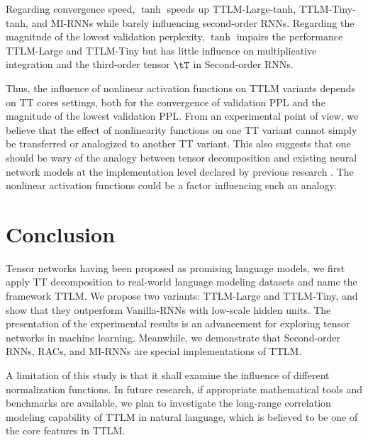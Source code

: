 \documentclass{article}
\newcommand{\benyou}[1]{{\bf \color{blue} [[benyou says ``#1'']]}}
\theoremstyle{plain}
\theoremstyle{definition}
\theoremstyle{remark}
\begin{document}
Regarding convergence speed, $\tanh$ speeds up TTLM-Large-tanh, TTLM-Tiny-tanh, and MI-RNNs while barely influencing second-order RNNs. Regarding the magnitude of the lowest validation perplexity,  $\tanh$ impairs the performance  TTLM-Large and TTLM-Tiny but has little influence on multiplicative integration and the third-order tensor $\tT$ in Second-order RNNs.  

Thus, the influence of nonlinear activation functions on TTLM variants depends on TT cores settings, both for the convergence of validation PPL and the magnitude of the lowest validation PPL.  From an experimental point of view, we believe that the effect of nonlinearity functions on one TT variant cannot simply be transferred or analogized to another TT variant. This also suggests that one should be wary of the analogy between tensor decomposition and existing neural network models at the implementation level declared by previous research \citep{khrulkov2018expressive, levine2018benefits}. The nonlinear activation functions could be a factor influencing such an analogy.


\section{Conclusion}

Tensor networks having been proposed as promising language models, we first apply TT decomposition to real-world language modeling datasets and name the framework TTLM. We propose two variants: TTLM-Large and TTLM-Tiny, and show that they outperform Vanilla-RNNs with low-scale hidden units. The presentation of the experimental results is an advancement for exploring tensor networks in machine learning. Meanwhile, we demonstrate that Second-order RNNs, RACs, and MI-RNNs are special implementations of TTLM. 

A limitation of this study is that it shall examine the influence of different normalization functions. In future research, if appropriate mathematical tools and benchmarks are available, we plan to investigate the long-range correlation modeling capability of TTLM in natural language, which is believed to be one of the core features in TTLM. 











\end{document}
